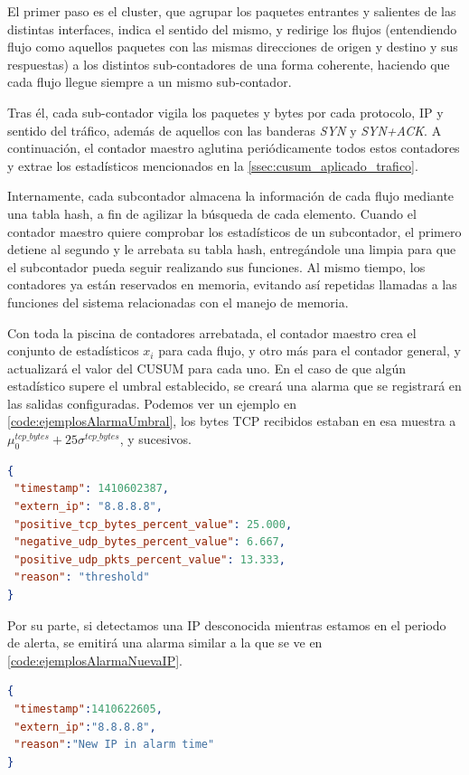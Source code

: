 El primer paso es el cluster, que agrupar los paquetes entrantes y salientes de las distintas 
interfaces, indica el sentido del mismo, y redirige los flujos (entendiendo flujo como aquellos
paquetes con las mismas direcciones de origen y destino y sus respuestas) a los distintos 
sub-contadores de una forma coherente, haciendo que cada flujo llegue siempre a un mismo sub-contador.

Tras él, cada sub-contador vigila los paquetes y bytes por cada protocolo, IP y sentido
del tráfico, además de aquellos con las banderas \emph{SYN} y \emph{SYN+ACK}. A continuación,
el contador maestro aglutina periódicamente todos estos contadores y extrae los estadísticos
mencionados en la \autoref{ssec:cusum_aplicado_trafico}.

Internamente, cada subcontador almacena la información de cada flujo mediante una tabla hash,
a fin de agilizar la búsqueda de cada elemento. Cuando el contador maestro quiere comprobar
los estadísticos de un subcontador, el primero detiene al segundo y le arrebata su tabla hash,
entregándole una limpia para que el subcontador pueda seguir realizando sus funciones. Al
mismo tiempo, los contadores ya están reservados en memoria, evitando así repetidas
llamadas a las funciones del sistema relacionadas con el manejo de memoria.

Con toda la piscina de contadores arrebatada, el contador maestro crea el conjunto de
estadísticos $x_i$ para cada flujo, y otro más para el contador general, y actualizará
el valor del CUSUM para cada uno. En el caso de que algún estadístico supere el umbral
establecido, se creará una alarma que se registrará en las salidas configuradas. Podemos
ver un ejemplo en \autoref{code:ejemplosAlarmaUmbral}, los bytes TCP recibidos estaban en
esa muestra a $\mu_0^{tcp\_bytes}+25\sigma^{tcp\_bytes}$, y sucesivos.

\begin{lstlisting}[language=json,caption={Ejemplo de alarma por umbral superado}, breaklines=true, 
label=code:ejemplosAlarmaUmbral,float=htbp,basicstyle=\scriptsize,captionpos=b]
{
 "timestamp": 1410602387, 
 "extern_ip": "8.8.8.8", 
 "positive_tcp_bytes_percent_value": 25.000,
 "negative_udp_bytes_percent_value": 6.667, 
 "positive_udp_pkts_percent_value": 13.333, 
 "reason": "threshold"
}
\end{lstlisting}

Por su parte, si detectamos una IP desconocida mientras estamos en el periodo de alerta,
se emitirá una alarma similar a la que se ve en \autoref{code:ejemplosAlarmaNuevaIP}.

\begin{lstlisting}[language=json,caption={Ejemplo de alarma por nueva IP}, breaklines=true, 
label=code:ejemplosAlarmaNuevaIP,float=htbp,captionpos=b,basicstyle=\scriptsize]
{
 "timestamp":1410622605,
 "extern_ip":"8.8.8.8",
 "reason":"New IP in alarm time"
}
\end{lstlisting}

\endinput
